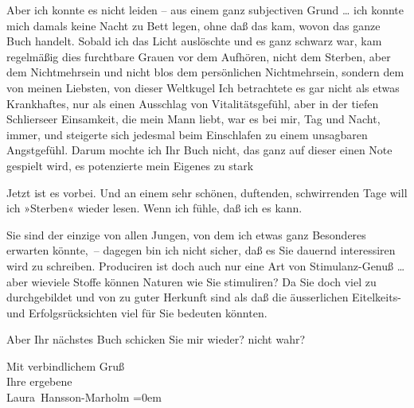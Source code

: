 \pstart
           Aber ich konnte es nicht leiden – aus einem ganz subjectiven Grund {\dots} ich konnte mich damals keine Nacht zu Bett legen, ohne
               daß das kam, wovon das ganze Buch handelt. Sobald ich das Licht auslöschte und es
               ganz schwarz war, kam regelmäßig dies furchtbare Grauen vor dem Aufhören, nicht dem
               Sterben, aber dem Nichtmehrsein und nicht blos dem persönlichen Nichtmehrsein,
               sondern dem von meinen Liebsten, von dieser Weltkugel{\dotsfour} Ich
               betrachtete es gar nicht als etwas Krankhaftes, nur als einen Ausschlag von
               Vitalitätsgefühl, aber in der tiefen Schlierseer
               Einsamkeit, die mein Mann
               liebt, war es bei mir, Tag und Nacht, immer, und steigerte sich jedesmal beim
               Einschlafen zu einem unsagbaren Angstgefühl. Darum mochte ich Ihr Buch nicht, das ganz auf dieser einen Note
               gespielt wird, es potenzierte mein Eigenes zu stark{\dotsfour}\pend
           
\pstart
           Jetzt ist es vorbei. Und an einem sehr schönen, duftenden, schwirrenden Tage will ich
                  »Sterben« wieder lesen. Wenn ich fühle, daß
                  {\pb}ich es kann.\pend
           
\pstart
           Sie sind der einzige von allen Jungen, von dem ich etwas ganz Besonderes erwarten
               könnte, – dagegen bin ich nicht sicher, daß es Sie dauernd interessiren wird zu
               schreiben. Produciren ist doch auch nur eine Art von Stimulanz-Genuß {\dots} aber wieviele Stoffe können Naturen wie Sie stimuliren?
               Da Sie doch viel zu durchgebildet und von zu guter Herkunft sind als daß die
               äusserlichen Eitelkeits- und Erfolgsrücksichten viel für Sie bedeuten könnten.\pend
           
\pstart
           Aber Ihr nächstes Buch schicken Sie mir wieder? nicht wahr?\pend
           
\pstart
           Mit verbindlichem Gruß{\\[\baselineskip]} Ihre ergebene{\\[\baselineskip]}\spacefill\mbox{Laura Hansson-Marholm}\pend
           \leftskip=0em{}\endnumbering{}  
      